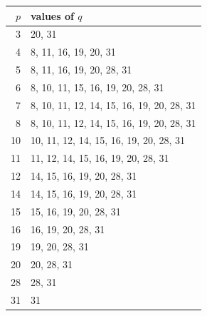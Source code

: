 \begin{center}\begin{tabular}{rl}\toprule
$p$&values of $q$\\\midrule
3&20, 31\\
4&8, 11, 16, 19, 20, 31\\
5&8, 11, 16, 19, 20, 28, 31\\
6&8, 10, 11, 15, 16, 19, 20, 28, 31\\
7&8, 10, 11, 12, 14, 15, 16, 19, 20, 28, 31\\
8&8, 10, 11, 12, 14, 15, 16, 19, 20, 28, 31\\
10&10, 11, 12, 14, 15, 16, 19, 20, 28, 31\\
11&11, 12, 14, 15, 16, 19, 20, 28, 31\\
12&14, 15, 16, 19, 20, 28, 31\\
14&14, 15, 16, 19, 20, 28, 31\\
15&15, 16, 19, 20, 28, 31\\
16&16, 19, 20, 28, 31\\
19&19, 20, 28, 31\\
20&20, 28, 31\\
28&28, 31\\
31&31\\
\bottomrule\end{tabular}\end{center}
